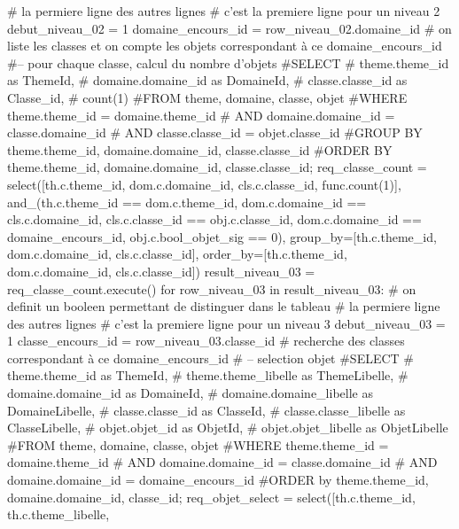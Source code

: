 \documentclass[12pt,titlepage]{book}
\begin{document}
\begin{lbdpython}
      # la permiere ligne des autres lignes
      # c'est la premiere ligne pour un niveau 2
      debut_niveau_02 = 1
      domaine_encours_id = row_niveau_02.domaine_id
      # on liste les classes et on compte les objets correspondant à ce domaine_encours_id
      #-- pour chaque classe, calcul du nombre d'objets
      #SELECT
      #   theme.theme_id as ThemeId,
      #   domaine.domaine_id as DomaineId,
      #   classe.classe_id as Classe_id,
      #   count(1)
      #FROM theme, domaine, classe, objet
      #WHERE theme.theme_id = domaine.theme_id 
      #  AND domaine.domaine_id = classe.domaine_id
      #  AND classe.classe_id = objet.classe_id
      #GROUP BY theme.theme_id, domaine.domaine_id, classe.classe_id
      #ORDER BY theme.theme_id, domaine.domaine_id, classe.classe_id;
      req_classe_count = select([th.c.theme_id, dom.c.domaine_id,
                                 cls.c.classe_id, func.count(1)],
                         and_(th.c.theme_id == dom.c.theme_id,
                              dom.c.domaine_id == cls.c.domaine_id,
                              cls.c.classe_id == obj.c.classe_id,
                              dom.c.domaine_id == domaine_encours_id,
                              obj.c.bool_objet_sig == 0),
                         group_by=[th.c.theme_id, dom.c.domaine_id, cls.c.classe_id],
                         order_by=[th.c.theme_id, dom.c.domaine_id, cls.c.classe_id])
      result_niveau_03 = req_classe_count.execute()
      for row_niveau_03 in result_niveau_03:
         # on definit un booleen permettant de distinguer dans le tableau
         # la permiere ligne des autres lignes
         # c'est la premiere ligne pour un niveau 3
         debut_niveau_03 = 1
         classe_encours_id = row_niveau_03.classe_id
         # recherche des classes correspondant à ce domaine_encours_id
         # -- selection objet
         #SELECT
         #   theme.theme_id as ThemeId,
         #   theme.theme_libelle as ThemeLibelle,
         #   domaine.domaine_id as DomaineId,
         #   domaine.domaine_libelle as DomaineLibelle,
         #   classe.classe_id as ClasseId,
         #   classe.classe_libelle as ClasseLibelle,
         #   objet.objet_id as ObjetId,
         #   objet.objet_libelle as ObjetLibelle
         #FROM theme, domaine, classe, objet
         #WHERE theme.theme_id = domaine.theme_id
         #  AND domaine.domaine_id = classe.domaine_id
         #  AND domaine.domaine_id = domaine_encours_id
         #ORDER by theme.theme_id, domaine.domaine_id, classe_id;
         req_objet_select = select([th.c.theme_id, th.c.theme_libelle,

\end{lbdpython}
\end{document}
